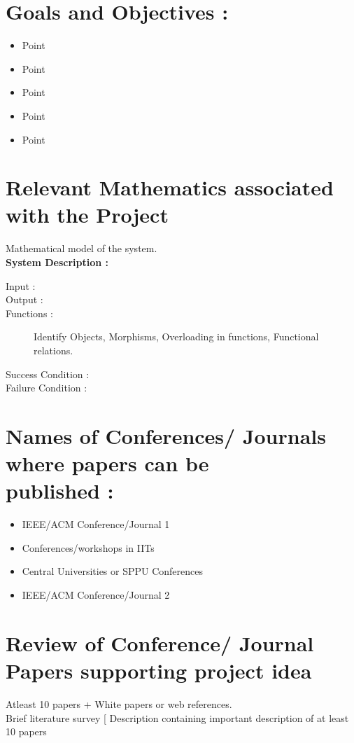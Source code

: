\documentclass{report} %
\begin{document}
		\section{Goals and Objectives :}
			\begin{itemize}
				\item Point
				\item Point
				\item Point
				\item Point
				\item Point
			\end{itemize}
		
		\section{Relevant Mathematics associated with the Project}
		Mathematical model of the system. \\
		
		\flushleft
		\textbf{System Description :}
			\begin{description}
				\item [Input :]
				\item [Output :]
				\item [Functions :] Identify Objects, Morphisms, Overloading in functions, Functional relations.
				\item [Success Condition :]
				\item [Failure Condition :]
			\end{description}
		
		\section{Names of Conferences/ Journals where papers can be \\ published :}
			\begin{itemize}
				\item IEEE/ACM Conference/Journal 1
				\item Conferences/workshops in IITs
				\item Central Universities or SPPU Conferences
				\item IEEE/ACM Conference/Journal 2
			\end{itemize}
		
		\section{Review of Conference/ Journal Papers supporting project idea}
		Atleast 10 papers + White papers or web references. \\
		Brief literature survey [ Description containing important description of at least 10
		papers
		
\end{document}
